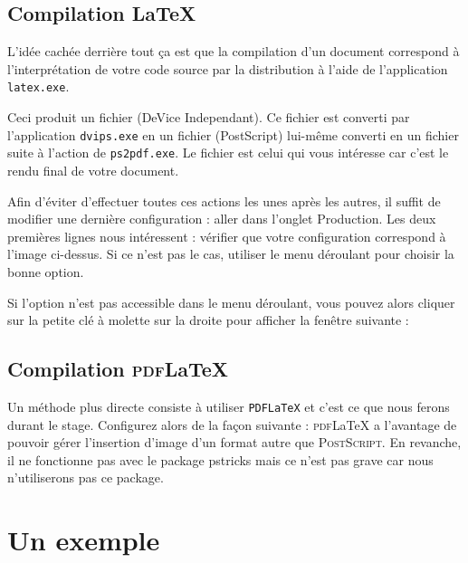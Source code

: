 \subsection{Compilation \LaTeX}
L'idée cachée derrière tout ça est que la compilation d'un document correspond à l'interprétation de votre code source par la distribution \texlive à l'aide de l'application \verb+latex.exe+.\par
Ceci produit un fichier  (DeVice Independant). Ce fichier est converti par l'application \verb+dvips.exe+ en un fichier  (PostScript) lui-même converti en un fichier  suite à l'action de \verb+ps2pdf.exe+. Le fichier  est celui qui vous intéresse car c'est le rendu final de votre document.\par
Afin d'éviter d'effectuer toutes ces actions les unes après les autres, il suffit de modifier une dernière configuration : aller dans l'onglet {\sf Production}.
Les deux premières lignes nous intéressent : vérifier que votre configuration correspond à l'image ci-dessus. Si ce n'est pas le cas, utiliser le menu déroulant pour choisir la bonne option.\par
Si l'option n'est pas accessible dans le menu déroulant, vous pouvez alors cliquer sur la petite clé à molette sur la droite pour afficher la fenêtre suivante :

\subsection{Compilation \textsc{pdf}\LaTeX}
Un méthode plus directe consiste à utiliser \verb+PDFLaTeX+ et c'est ce que nous ferons durant le stage. Configurez alors \texstudio de la façon suivante :
\textsc{pdf}\LaTeX{} a l'avantage de pouvoir gérer l'insertion d'image d'un format autre que \textsc{PostScript}. En revanche, il ne fonctionne pas avec le package {\sffamily pstricks} mais ce n'est pas grave car nous n'utiliserons pas ce package.


\section{Un exemple}


